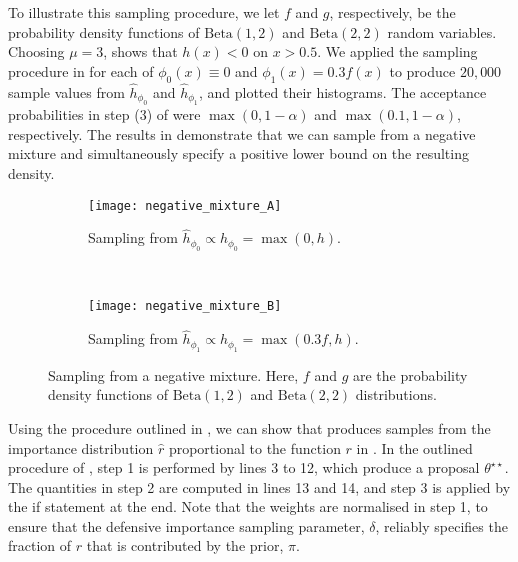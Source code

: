 \documentclass[12pt, onecolumn]{article}
\begin{document}
To illustrate this sampling procedure, we let $f$ and $g$, respectively, be the probability density functions of $\mathrm{Beta}(1,2)$ and $\mathrm{Beta}(2,2)$ random variables.
Choosing $\mu = 3$,  shows that $h(x)<0$ on $x>0.5$.
We applied the sampling procedure in  for each of $\phi_0(x) \equiv 0$ and $\phi_1(x) = 0.3f(x)$ to produce $20,000$ sample values from $\hat h_{\phi_0}$ and $\hat h_{\phi_1}$, and plotted their histograms.
The acceptance probabilities in step (3) of  were $\max(0, 1-\alpha)$ and $\max(0.1, 1 - \alpha)$, respectively.
The results in  demonstrate that we can sample from a negative mixture and simultaneously specify a positive lower bound on the resulting density.

\begin{figure}
\centering
\begin{subfigure}[b]{0.48\textwidth}
 \texttt{[image: negative\_mixture\_A]}
 \caption{Sampling from $\hat h_{\phi_0} \propto h_{\phi_0} = \max(0,h)$.}
 \label{fig:negative_mixture_A}
\end{subfigure}
~
\begin{subfigure}[b]{0.48\textwidth}
 \texttt{[image: negative\_mixture\_B]}
 \caption{Sampling from $\hat h_{\phi_1} \propto h_{\phi_1} = \max(0.3f, h)$.}
 \label{fig:negative_mixture_B}
\end{subfigure}
\caption{Sampling from a negative mixture. Here, $f$ and $g$ are the probability density functions of $\mathrm{Beta}(1,2)$ and $\mathrm{Beta}(2,2)$ distributions.}
\label{fig:negative_mixture}
\end{figure}

Using the procedure outlined in , we can show that  produces samples from the importance distribution $\hat r$ proportional to the function $r$ in .
In the outlined procedure of , step 1 is performed by lines 3 to 12, which produce a proposal $\theta^{\star \star}$.
The quantities in step 2 are computed in lines 13 and 14, and step 3 is applied by the if statement at the end.
Note that the weights are normalised in step 1, to ensure that the defensive importance sampling parameter, $\delta$, reliably specifies the fraction of $r$ that is contributed by the prior, $\pi$.
\end{document}
